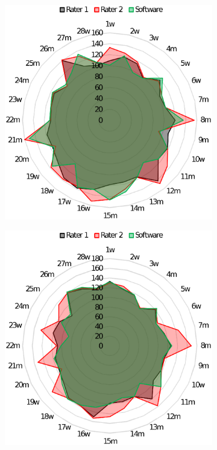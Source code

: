 %
\begin{figure}[H]
	\centering
	\begin{subfigure}[c]{0.45\textwidth}
		\centering
		\includegraphics[scale=0.42]{Bilder/v-slope_net.eps}
			\label{subpic:pic1}
	\end{subfigure}%
	\hfil
	\begin{subfigure}[c]{0.45\textwidth}
		\centering
		\includegraphics[scale=0.42]{Bilder/eqo2_net.eps}

\end{subfigure}
\end{figure}
